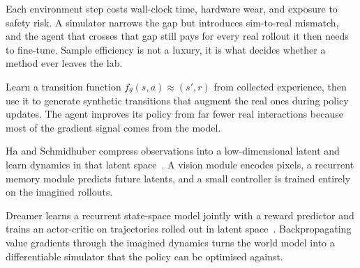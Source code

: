 Each environment step costs wall-clock time, hardware wear, and exposure to safety risk.
A simulator narrows the gap but introduces sim-to-real mismatch,
and the agent that crosses that gap still pays for every real rollout it then needs to fine-tune.
Sample efficiency is not a luxury, it is what decides whether a method ever leaves the lab.

Learn a transition function $f_\theta(s, a) \approx (s', r)$ from collected experience,
then use it to generate synthetic transitions that augment the real ones during policy updates.
The agent improves its policy from far fewer real interactions
because most of the gradient signal comes from the model.

Ha and Schmidhuber compress observations into a low-dimensional latent
and learn dynamics in that latent space~\cite{Ha2018WorldModels}.
A vision module encodes pixels, a recurrent memory module predicts future latents,
and a small controller is trained entirely on the imagined rollouts.


Dreamer learns a recurrent state-space model jointly with a reward predictor
and trains an actor-critic on trajectories rolled out in latent space~\cite{Hafner2020Dreamer}.
Backpropagating value gradients through the imagined dynamics
turns the world model into a differentiable simulator that the policy can be optimised against.


